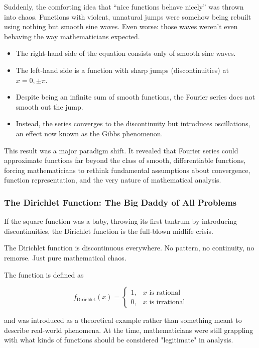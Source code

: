 \documentclass{article}
\begin{document}
Suddenly, the comforting idea that “nice functions behave nicely” was thrown into chaos. Functions with violent, unnatural jumps were somehow being rebuilt using nothing but smooth sine waves. Even worse: those waves weren’t even behaving the way mathematicians expected. 

\begin{itemize}
    \item The right-hand side of the equation consists only of smooth sine waves.
    \item The left-hand side is a function with sharp jumps (discontinuities) at \( x = 0, \pm \pi \).
    \item Despite being an infinite sum of smooth functions, the Fourier series does not smooth out the jump.
    \item Instead, the series converges to the discontinuity but introduces oscillations, an effect now known as the Gibbs phenomenon.
\end{itemize}

This result was a major paradigm shift. It revealed that Fourier series could approximate functions far beyond the class of smooth, differentiable functions, forcing mathematicians to rethink fundamental assumptions about convergence, function representation, and the very nature of mathematical analysis.

\subsubsection{The Dirichlet Function: The Big Daddy of All Problems}

If the square function was a baby, throwing its first tantrum by introducing discontinuities, the Dirichlet function is the full-blown midlife crisis. 

The Dirichlet function is discontinuous everywhere. No pattern, no continuity, no remorse. Just pure mathematical chaos.

The function is defined as

\[
f_{\text{Dirichlet}}(x) =
\begin{cases} 
1, & x \text{ is rational} \\
0, & x \text{ is irrational}
\end{cases}
\]

and was introduced as a theoretical example rather than something meant to describe real-world phenomena. At the time, mathematicians were still grappling with what kinds of functions should be considered "legitimate" in analysis. 
\end{document}
